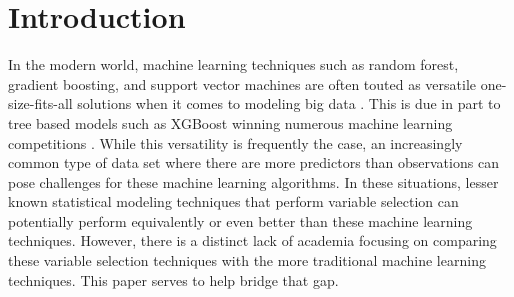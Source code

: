 \documentclass{article}
\begin{document}
	\section{Introduction}
	
	In the modern world, machine learning techniques such as random forest, gradient boosting, and support vector machines are often touted as versatile one-size-fits-all solutions when it comes to modeling big data \cite{nielsen2016tree}. This is due in part to tree based models such as XGBoost winning numerous machine learning competitions \cite{nielsen2016tree}. While this versatility is frequently the case, an increasingly common type of data set where there are more predictors than observations can pose challenges for these machine learning algorithms. In these situations, lesser known statistical modeling techniques that perform variable selection can potentially perform equivalently or even better than these machine learning techniques. However, there is a distinct lack of academia focusing on comparing these variable selection techniques with the more traditional machine learning techniques. This paper serves to help bridge that gap.
	
	
	
\end{document}
